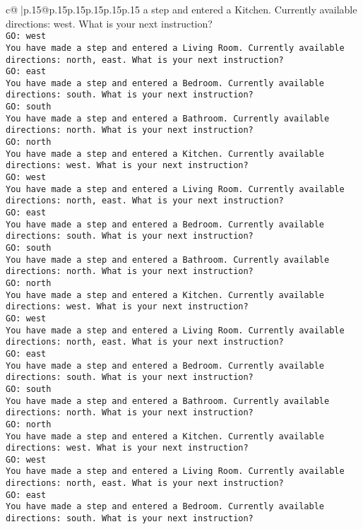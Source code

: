 \documentclass{article}
\begin{document}
{\begin{supertabular}{c@{$\;$}|p{.15\linewidth}@{}p{.15\linewidth}p{.15\linewidth}p{.15\linewidth}p{.15\linewidth}p{.15\linewidth}}
{{{a step and entered a Kitchen. Currently available directions: west. What is your next instruction?\\ \tt GO: west\\ \tt You have made a step and entered a Living Room. Currently available directions: north, east. What is your next instruction?\\ \tt GO: east\\ \tt You have made a step and entered a Bedroom. Currently available directions: south. What is your next instruction?\\ \tt GO: south\\ \tt You have made a step and entered a Bathroom. Currently available directions: north. What is your next instruction?\\ \tt GO: north\\ \tt You have made a step and entered a Kitchen. Currently available directions: west. What is your next instruction?\\ \tt GO: west\\ \tt You have made a step and entered a Living Room. Currently available directions: north, east. What is your next instruction?\\ \tt GO: east\\ \tt You have made a step and entered a Bedroom. Currently available directions: south. What is your next instruction?\\ \tt GO: south\\ \tt You have made a step and entered a Bathroom. Currently available directions: north. What is your next instruction?\\ \tt GO: north\\ \tt You have made a step and entered a Kitchen. Currently available directions: west. What is your next instruction?\\ \tt GO: west\\ \tt You have made a step and entered a Living Room. Currently available directions: north, east. What is your next instruction?\\ \tt GO: east\\ \tt You have made a step and entered a Bedroom. Currently available directions: south. What is your next instruction?\\ \tt GO: south\\ \tt You have made a step and entered a Bathroom. Currently available directions: north. What is your next instruction?\\ \tt GO: north\\ \tt You have made a step and entered a Kitchen. Currently available directions: west. What is your next instruction?\\ \tt GO: west\\ \tt You have made a step and entered a Living Room. Currently available directions: north, east. What is your next instruction?\\ \tt GO: east\\ \tt You have made a step and entered a Bedroom. Currently available directions: south. What is your next instruction?\\ }}}
\end{supertabular}}
\end{document}
